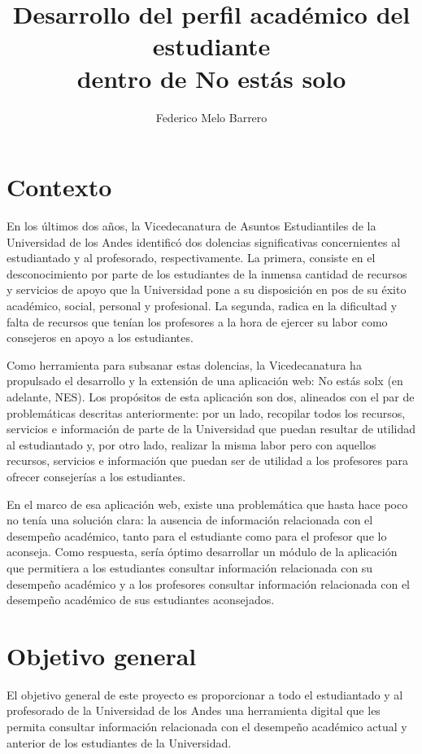 \documentclass{fmb-proposal}
\title{Desarrollo del perfil académico del estudiante\\dentro de No estás solo}
\author{Federico Melo Barrero\inst{1}}
\begin{document}
\maketitle

\section{Contexto}

En los últimos dos años, la Vicedecanatura de Asuntos Estudiantiles de la Universidad de los Andes identificó dos dolencias significativas concernientes al estudiantado y al profesorado, respectivamente. La primera, consiste en el desconocimiento por parte de los estudiantes de la inmensa cantidad de recursos y servicios de apoyo que la Universidad pone a su disposición en pos de su éxito académico, social, personal y profesional. La segunda, radica en la dificultad y falta de recursos que tenían los profesores a la hora de ejercer su labor como consejeros en apoyo a los estudiantes.

Como herramienta para subsanar estas dolencias, la Vicedecanatura ha propulsado el desarrollo y la extensión de una aplicación web: No estás solx (en adelante, NES). Los propósitos de esta aplicación son dos, alineados con el par de problemáticas descritas anteriormente: por un lado, recopilar todos los recursos, servicios e información de parte de la Universidad que puedan resultar de utilidad al estudiantado y, por otro lado, realizar la misma labor pero con aquellos recursos, servicios e información que puedan ser de utilidad a los profesores para ofrecer consejerías a los estudiantes.

En el marco de esa aplicación web, existe una problemática que hasta hace poco no tenía una solución clara: la ausencia de información relacionada con el desempeño académico, tanto para el estudiante como para el profesor que lo aconseja. Como respuesta, sería óptimo desarrollar un módulo de la aplicación que permitiera a los estudiantes consultar información relacionada con su desempeño académico y a los profesores consultar información relacionada con el desempeño académico de sus estudiantes aconsejados.


\section{Objetivo general}

El objetivo general de este proyecto es proporcionar a todo el estudiantado y al profesorado de la Universidad de los Andes una herramienta digital que les permita consultar información relacionada con el desempeño académico actual y anterior de los estudiantes de la Universidad.
\end{document}
